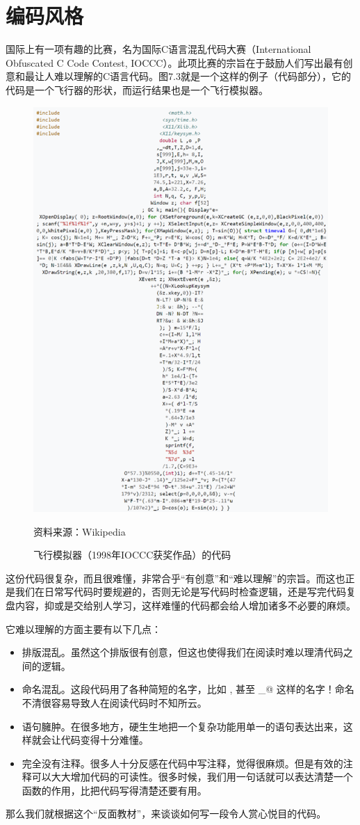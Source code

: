 \section{编码风格}
国际上有一项有趣的比赛，名为国际C语言混乱代码大赛（International Obfuscated C Code Contest, IOCCC）。此项比赛的宗旨在于鼓励人们写出最有创意和最让人难以理解的C语言代码。图7.3就是一个这样的例子（代码部分），它的代码是一个飞行器的形状，而运行结果也是一个飞行模拟器。\par
\begin{figure}[p]
    \centering
    \includegraphics[width=.8\textwidth]{../images/generalized_parts/07_international_obfuscated_c_code_contest_instance.png}
    \caption{飞行模拟器（1998年IOCCC获奖作品）的代码}
    \footnotesize{资料来源：Wikipedia}
\end{figure}
这份代码很复杂，而且很难懂，非常合乎``有创意''和``难以理解''的宗旨。而这也正是我们在日常写代码时要规避的，否则无论是写代码时检查逻辑，还是写完代码复盘内容，抑或是交给别人学习，这样难懂的代码都会给人增加诸多不必要的麻烦。\par\pagebreak
它难以理解的方面主要有以下几点：
\begin{itemize}
    \item 排版混乱。虽然这个排版很有创意，但这也使得我们在阅读时难以理清代码之间的逻辑。
    \item 命名混乱。这段代码用了各种简短的名字，比如 \lstinline@L@, \lstinline@o@ 甚至 \lstinline@_@ 这样的名字！命名不清很容易导致人在阅读代码时不知所云。
    \item 语句臃肿。在很多地方，硬生生地把一个复杂功能用单一的语句表达出来，这样就会让代码变得十分难懂。
    \item 完全没有注释。很多人十分反感在代码中写注释，觉得很麻烦。但是有效的注释可以大大增加代码的可读性。很多时候，我们用一句话就可以表达清楚一个函数的作用，比把代码写得清楚还要有用。
\end{itemize}
那么我们就根据这个``反面教材''，来谈谈如何写一段令人赏心悦目的代码。\par

